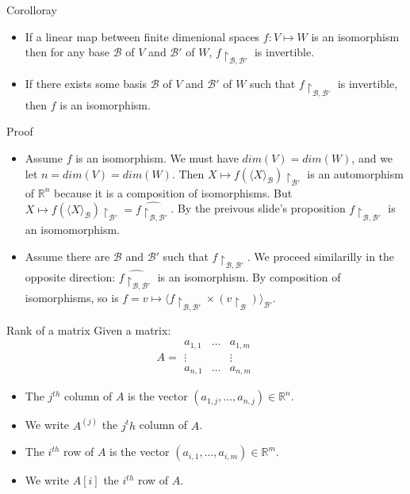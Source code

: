 \documentclass{beamer}
\begin{document}
\begin{frame}
  \begin{block}{Corolloray}
    \begin{itemize}
    \item If a linear map between finite dimenional spaces $f: V \mapsto W$ is an isomorphism then for any base $\mathcal{B}$ of $V$ and $\mathcal{B}'$ of $W$, $f \restriction_{\mathcal{B}, \mathcal{B}'}$ is invertible.
    \item If there exists some basis $\mathcal{B}$ of $V$ and $\mathcal{B}'$ of $W$ such that $f \restriction_{\mathcal{B}, \mathcal{B}'}$ is invertible, then $f$ is an isomorphism.
    \end{itemize}
  \end{block}

  \begin{exampleblock}{Proof}
    \begin{itemize}
    \item Assume $f$ is an isomorphism. We must have $dim(V) = dim(W)$, and we let $n = dim(V) = dim(W)$. Then $X \mapsto f(\langle X \rangle_{\mathcal{B}}) \restriction_{\mathcal{B}'}$ is an automorphism of $\mathbb{R}^{n}$ because it is a composition of isomorphisms. But $X \mapsto f(\langle X \rangle_{\mathcal{B}}) \restriction_{\mathcal{B}'} = \widehat{f \restriction_{\mathcal{B}, \mathcal{B}'}}$. By the preivous slide's proposition $f \restriction_{\mathcal{B}, \mathcal{B}'}$ is an isomomorphism.
    \item Assume there are $\mathcal{B}$ and $\mathcal{B}'$ such that $f \restriction_{\mathcal{B}, \mathcal{B}'}$. We proceed similarilly in the opposite direction: $\widehat{f \restriction_{\mathcal{B}, \mathcal{B}'}}$ is an isomorphism. By composition of isomorphisms, so is $f = v \mapsto  \langle f \restriction_{\mathcal{B}, \mathcal{B}'} \times (v \restriction_{\mathcal{B}}) \rangle_{\mathcal{B'}}$.
    \end{itemize}
  \end{exampleblock}
\end{frame}


\begin{frame}{Rank of a matrix}
  Given a matrix: \[A = \begin{array}{|ccc|} a_{1,1} & \dots & a_{1,m}\\ \vdots & & \vdots\\ a_{n,1} & \dots & a_{n, m} \end{array}\]
  \begin{itemize}
  \item The $j^{th}$ column of $A$ is the vector $(a_{1,j}, \dots, a_{n, j}) \in \mathbb{R}^n$.
  \item We write $A^{(j)}$ the $j^th$ column of $A$.
  \item The $i^{th}$ row of $A$ is the vector $(a_{i, 1}, \dots, a_{i, m}) \in \mathbb{R}^m$.
  \item We write $A[i]$ the $i^{th}$ row of $A$.
  \end{itemize}
\end{frame}
\end{document}
